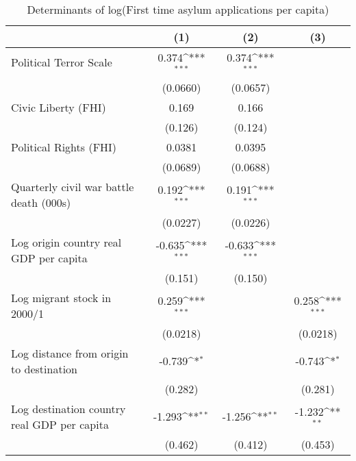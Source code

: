 \begin{table}[htbp]\centering
\def\sym#1{\ifmmode^{#1}\else\(^{#1}\)\fi}
\caption{Determinants of log(First time asylum applications per capita)}
\begin{tabular}{l*{3}{c}}
\hline\hline
                    &\multicolumn{1}{c}{(1)}         &\multicolumn{1}{c}{(2)}         &\multicolumn{1}{c}{(3)}         \\
\hline
Political Terror Scale&       0.374\sym{***}&       0.374\sym{***}&                     \\
                    &    (0.0660)         &    (0.0657)         &                     \\
[1em]
Civic Liberty (FHI) &       0.169         &       0.166         &                     \\
                    &     (0.126)         &     (0.124)         &                     \\
[1em]
Political Rights (FHI)&      0.0381         &      0.0395         &                     \\
                    &    (0.0689)         &    (0.0688)         &                     \\
[1em]
Quarterly civil war battle death (000s)&       0.192\sym{***}&       0.191\sym{***}&                     \\
                    &    (0.0227)         &    (0.0226)         &                     \\
[1em]
Log origin country real GDP per capita&      -0.635\sym{***}&      -0.633\sym{***}&                     \\
                    &     (0.151)         &     (0.150)         &                     \\
[1em]
Log migrant stock in 2000/1&       0.259\sym{***}&                     &       0.258\sym{***}\\
                    &    (0.0218)         &                     &    (0.0218)         \\
[1em]
Log distance from origin to destination&      -0.739\sym{*}  &                     &      -0.743\sym{*}  \\
                    &     (0.282)         &                     &     (0.281)         \\
[1em]
Log destination country real GDP per capita&      -1.293\sym{**} &      -1.256\sym{**} &      -1.232\sym{**} \\
                    &     (0.462)         &     (0.412)         &     (0.453)         \\

\end{tabular}
\end{table}
